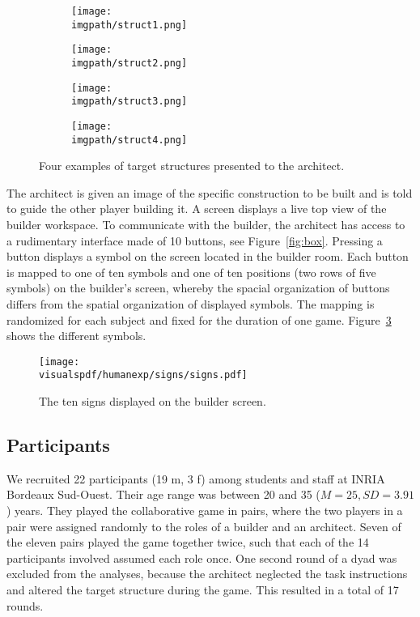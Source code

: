 \begin{figure}[!htbp]
    \centering
    \begin{subfigure}[b]{0.24\columnwidth}
        \centering
        \texttt{[image: \\imgpath/struct1.png]}
        \caption{}
    \end{subfigure}
    \begin{subfigure}[b]{0.74\columnwidth}
        \centering
        \texttt{[image: \\imgpath/struct2.png]}
        \caption{}
    \end{subfigure}
    \begin{subfigure}[b]{0.49\columnwidth}
        \centering
        \texttt{[image: \\imgpath/struct3.png]}
        \caption{}
        \label{fig:sc}
    \end{subfigure}
    \begin{subfigure}[b]{0.49\columnwidth}
        \centering
        \texttt{[image: \\imgpath/struct4.png]}
        \caption{}
    \end{subfigure}
    \caption{Four examples of target structures presented to the architect.} 
    \label{fig:structures}
\end{figure}

The architect is given an image of the specific construction to be built and is told to guide the other player building it. A screen displays a live top view of the builder workspace. To communicate with the builder, the architect has access to a rudimentary interface made of 10 buttons, see Figure~\ref{fig:box}. Pressing a button displays a symbol on the screen located in the builder room. Each button is mapped to one of ten symbols and one of ten positions (two rows of five symbols) on the builder's screen, whereby the spacial organization of buttons differs from the spatial organization of displayed symbols. The mapping is randomized for each subject and fixed for the duration of one game. Figure~\ref{fig:sign} shows the different symbols.

\begin{figure}[!htbp]
\centering
\texttt{[image: \\visualspdf/humanexp/signs/signs.pdf]}
\caption{The ten signs displayed on the builder screen.}
\label{fig:sign}
\end{figure}

\subsection{Participants}

We recruited 22 participants (19 m, 3 f) among students and staff at INRIA Bordeaux Sud-Ouest. Their age range was between 20 and 35 ($M = 25, SD = 3.91$) years. They played the collaborative game in pairs, where the two players in a pair were assigned randomly to the roles of a builder and an architect. Seven of the eleven pairs played the game together twice, such that each of the 14 participants involved assumed each role once. One second round of a dyad was excluded from the analyses, because the architect neglected the task instructions and altered the target structure during the game. This resulted in a total of 17 rounds.

